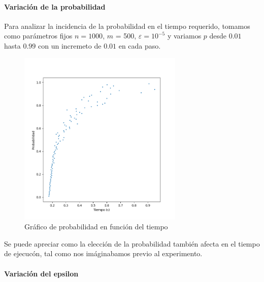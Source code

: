 \paragraph{Variaci\'on de la probabilidad}
Para analizar la incidencia de la probabilidad en el tiempo requerido, tomamos como par\'ametros fijos $n = 1000$, $m$ = 500,
$\varepsilon = 10^{-5}$ y variamos $p$ desde $0.01$ hasta $0.99$ con un incremeto de $0.01$ en cada paso.
\begin{figure}[H] 
\centering
\includegraphics[width=0.7\textwidth]{img/Proba.png}
\caption{Gr\'afico de probabilidad en funci\'on del tiempo}
\label{fig:proba}
\end{figure}

Se puede apreciar como la elecci\'on de la probabilidad tambi\'en afecta en el tiempo de ejecuc\'on, tal como nos im\'aginabamos previo al experimento.

\paragraph{Variaci\'on del epsilon}

